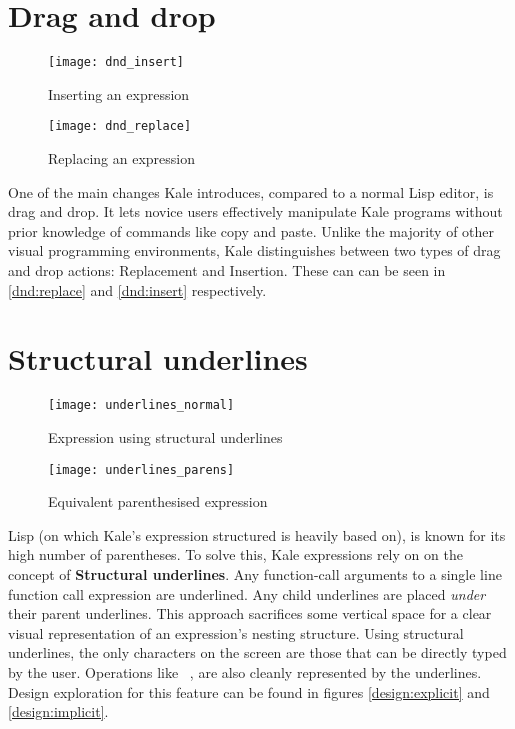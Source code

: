 \section{Drag and drop}
\begin{wrapfigure}[7]{r}{6.5cm}
	\vspace*{-2mm}
	\centering
	\begin{minipage}{3cm}
	\capstart
	\texttt{[image: dnd\_insert]}
	\vspace*{-14mm}
	\caption{\centering Inserting an expression}
	\label{dnd:insert}
	\end{minipage}
	\begin{minipage}{3cm}
	\capstart
	\texttt{[image: dnd\_replace]}
	\vspace*{-14mm}
	\caption{\centering Replacing an expression}
	\label{dnd:replace}
	\end{minipage}
\end{wrapfigure}
One of the main changes Kale introduces, compared to a normal Lisp editor, is
drag and drop. It lets novice users effectively manipulate Kale programs
without prior knowledge of commands like copy and paste. Unlike the majority
of other visual programming environments, Kale distinguishes
between two types of drag and drop actions: Replacement and Insertion.
These can can be seen in \autoref{dnd:replace} and \autoref{dnd:insert}
respectively.

\section{Structural underlines}
\setlength{\columnsep}{25pt}
\begin{wrapfigure}[8]{r}{6.5cm}
	\vspace{-3mm}
	\texttt{[image: underlines\_normal]}
	\vspace{-7mm}
	\caption{Expression using structural underlines}
	\label{underlines:normal}
	\bigskip
	\texttt{[image: underlines\_parens]}
	\vspace{-12mm}
	\caption{Equivalent parenthesised expression}
	\label{underlines:parens}
\end{wrapfigure}
Lisp (on which Kale's expression structured is heavily based on), is known
for its high number of parentheses. To solve this, Kale expressions rely on
on the concept of \textbf{Structural underlines}. Any function-call arguments
to a single line function call expression are underlined. Any child underlines are
placed \emph{under} their parent underlines. This approach sacrifices some
vertical space for a clear visual representation of an expression's nesting
structure. Using structural underlines, the only characters on the screen are
those that can be directly typed by the user. Operations like
\hyperref[cmd:move_up]{}~, are also cleanly
represented by the underlines. Design exploration for this feature can be
found in figures
\ref{design:explicit} and \ref{design:implicit}.

